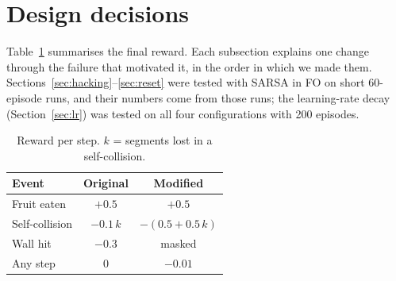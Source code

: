 \documentclass{article}
\begin{document}
\section{Design decisions}
\label{sec:design}

Table~\ref{tab:reward} summarises the final reward. Each subsection explains one change through the failure that motivated it, in the order in which we made them. Sections~\ref{sec:hacking}--\ref{sec:reset} were tested with SARSA in FO on short 60-episode runs, and their numbers come from those runs; the learning-rate decay (Section~\ref{sec:lr}) was tested on all four configurations with 200 episodes.

\begin{table}[t]
\caption{Reward per step. $k$ = segments lost in a self-collision.}
\label{tab:reward}
\vskip 0.1in
\begin{center}
\begin{small}
\begin{tabular}{lcc}
\toprule
Event & Original & Modified \\
\midrule
Fruit eaten        & $+0.5$      & $+0.5$ \\
Self-collision     & $-0.1\,k$   & $-(0.5+0.5\,k)$ \\
Wall hit           & $-0.3$      & masked \\
Any step           & $0$         & $-0.01$ \\
\bottomrule
\end{tabular}
\end{small}
\end{center}
\vskip -0.15in
\end{table}
\end{document}
